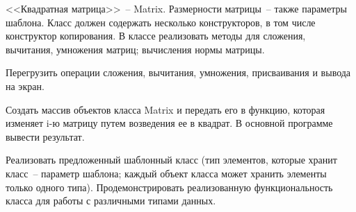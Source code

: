 
<<Квадратная матрица>>~-- Matrix. Размерности матрицы~-- также параметры шаблона.
Класс должен содержать несколько конструкторов, в том числе конструктор копирования.
В классе реализовать методы для сложения, вычитания, умножения матриц; вычисления
нормы матрицы.

Перегрузить операции сложения, вычитания, умножения, присваивания и
вывода на экран.

Создать массив объектов класса Matrix и передать его в функцию,
которая изменяет i-ю матрицу путем возведения ее в квадрат. В основной программе
вывести результат.

Реализовать предложенный шаблонный класс (тип элементов, которые
хранит класс~-- параметр шаблона; каждый объект класса может хранить
элементы только одного типа). Продемонстрировать реализованную
функциональность класса для работы с различными типами данных.
